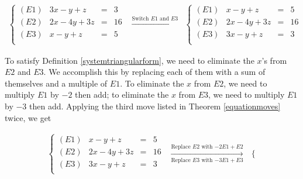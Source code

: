 \begin{ex}
\begin{enumerate}
\[\begin{array}{ccc}

\left\{  \begin{array}{lrcr}

(E1) & 3x-y+z & = & 3 \\
(E2)  & 2x-4y+3z & = & 16 \\
(E3)  &  x-y+z & = & 5 \\ 

\end{array} \right.

&
\xrightarrow{\text{Switch $E1$ and $E3$}}

&

\left\{ \begin{array}{lrcr}

(E1) & x-y+z & = & 5 \\
(E2) & 2x-4y+3z & = & 16 \\
(E3) & 3x-y+z & = & 3 \\

\end{array} \right.

\end{array}\]



To satisfy Definition \ref{systemtriangularform}, we need to eliminate the $x$'s from $E2$ and $E3$.  We accomplish this by replacing each of them with a sum of themselves and a multiple of $E1$.  To eliminate the $x$ from $E2$, we need to multiply $E1$ by $-2$ then add;  to eliminate the $x$ from $E3$, we need to multiply $E1$ by $-3$ then add.  Applying the third move listed in Theorem \ref{equationmoves} twice, we get

\[ \begin{array}{ccc}

\left\{ 

\begin{array}{lrcr}

(E1) & x-y+z & = & 5 \\
(E2) & 2x-4y+3z & = & 16 \\
(E3) & 3x-y+z & = & 3 \\

\end{array} 

\right.

&

\xrightarrow[\text{Replace $E3$ with $-3E1 + E3$}]{\text{Replace $E2$ with $-2E1 + E2$}}

&

\left\{ 


\end{array}\]
\end{enumerate}
\end{ex}
